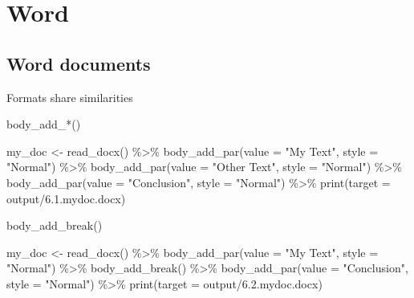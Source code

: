 \documentclass[
]{book}
\newenvironment{Shaded}{\begin{snugshade}}{\end{snugshade}}
\newcommand{\AttributeTok}[1]{\textcolor[rgb]{0.77,0.63,0.00}{#1}}
\newcommand{\FunctionTok}[1]{\textcolor[rgb]{0.00,0.00,0.00}{#1}}
\newcommand{\NormalTok}[1]{#1}
\newcommand{\OtherTok}[1]{\textcolor[rgb]{0.56,0.35,0.01}{#1}}
\newcommand{\SpecialCharTok}[1]{\textcolor[rgb]{0.00,0.00,0.00}{#1}}
\newcommand{\StringTok}[1]{\textcolor[rgb]{0.31,0.60,0.02}{#1}}
\begin{document}
\hypertarget{word-2}{%
\section{Word}\label{word-2}}

\hypertarget{word-documents}{%
\subsection{Word documents}\label{word-documents}}

Formats share similarities

body\_add\_*()

\begin{Shaded}
\begin{Highlighting}[]
\NormalTok{my\_doc }\OtherTok{\textless{}{-}} \FunctionTok{read\_docx}\NormalTok{() }\SpecialCharTok{\%\textgreater{}\%} 
  \FunctionTok{body\_add\_par}\NormalTok{(}\AttributeTok{value =} \StringTok{"My Text"}\NormalTok{, }\AttributeTok{style =} \StringTok{"Normal"}\NormalTok{) }\SpecialCharTok{\%\textgreater{}\%}
  \FunctionTok{body\_add\_par}\NormalTok{(}\AttributeTok{value =} \StringTok{"Other Text"}\NormalTok{, }\AttributeTok{style =} \StringTok{"Normal"}\NormalTok{) }\SpecialCharTok{\%\textgreater{}\%} 
  \FunctionTok{body\_add\_par}\NormalTok{(}\AttributeTok{value =} \StringTok{"Conclusion"}\NormalTok{, }\AttributeTok{style =} \StringTok{"Normal"}\NormalTok{) }\SpecialCharTok{\%\textgreater{}\%} 
  \FunctionTok{print}\NormalTok{(}\AttributeTok{target =} \StringTok{\textquotesingle{}output/6.1.mydoc.docx\textquotesingle{}}\NormalTok{)}
\end{Highlighting}
\end{Shaded}

body\_add\_break()

\begin{Shaded}
\begin{Highlighting}[]
\NormalTok{my\_doc }\OtherTok{\textless{}{-}} \FunctionTok{read\_docx}\NormalTok{() }\SpecialCharTok{\%\textgreater{}\%} 
  \FunctionTok{body\_add\_par}\NormalTok{(}\AttributeTok{value =} \StringTok{"My Text"}\NormalTok{, }\AttributeTok{style =} \StringTok{"Normal"}\NormalTok{) }\SpecialCharTok{\%\textgreater{}\%}
  \FunctionTok{body\_add\_break}\NormalTok{() }\SpecialCharTok{\%\textgreater{}\%} 
  \FunctionTok{body\_add\_par}\NormalTok{(}\AttributeTok{value =} \StringTok{"Conclusion"}\NormalTok{, }\AttributeTok{style =} \StringTok{"Normal"}\NormalTok{) }\SpecialCharTok{\%\textgreater{}\%} 
  \FunctionTok{print}\NormalTok{(}\AttributeTok{target =} \StringTok{\textquotesingle{}output/6.2.mydoc.docx\textquotesingle{}}\NormalTok{)}
\end{Highlighting}
\end{Shaded}
\end{document}
